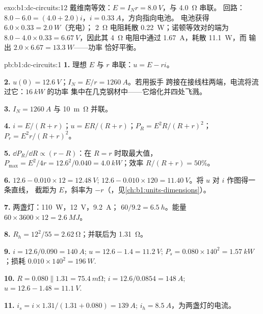 \begin{solution}{exo:b1:dc-circuits:12}
戴维南等效：$E = I_N r = \qty{8.0}{V}$，与 \qty{4.0}{\ohm} 串联。
回路：$8.0 - 6.0 = (4.0 + 2.0)i$，$i = \qty{0.33}{A}$，方向指向电池。
电池获得 $6.0 \times 0.33 = \qty{2.0}{W}$（充电）；
\qty{2}{\ohm} 电阻耗散 \qty{0.22}{W}；诺顿等效对的端为
$8.0 - 4.0 \times 0.33 = \qty{6.67}{V}$，因此其
\qty{4}{\ohm} 电阻中通过 \qty{1.67}{A}，耗散 \qty{11.1}{W}，而
输出 $2.0 \times 6.67 = \qty{13.3}{W}$——功率
恰好平衡。
\end{solution}

\begin{solution}{pb:b1:dc-circuits:1}
\textbf{1.} 理想 $E$ 与 $r$ 串联：$u = E - ri$。

\textbf{2.} $u(0) = \qty{12.6}{V}$；$I_N = E/r = \qty{1260}{A}$。若用扳手
跨接在接线柱两端，电流将流过它：$\qty{16}{kW}$ 的功率
集中在几克钢材中——它熔化并四处飞溅。

\textbf{3.}  $I_N = \qty{1260}{A}$ 与
\qty{10}{m\ohm} 并联。

\textbf{4.} $i = E/(R + r)$；$u = ER/(R + r)$；$P_R = E^2R/(R + r)^2$；
$P_r = E^2r/(R + r)^2$。

\textbf{5.} $\dd P_R/\dd R \propto (r - R)$：在 $R = r$ 时取最大值，
$P_{\max} = E^2/4r = 12.6^2/0.040 = \qty{4.0}{kW}$；效率
$R/(R + r) = 50\%$。

\textbf{6.} $12.6 - 0.010 \times 12 = \qty{12.48}{V}$; $12.6 - 0.010 \times
120 = \qty{11.40}{V}$。将 $u$ 对 $i$ 作图得一条直线，
截距为 $E$，斜率为 $-r$（，见\cref{ch:b1:units-dimensions}）。

\textbf{7.} 两盏灯：\qty{110}{W}，\qty{12}{V}，\qty{9.2}{A}；
$60/9.2 = \qty{6.5}{h}$。能量 $60 \times 3600 \times 12 = \qty{2.6}{MJ}$。

\textbf{8.} $R_h = 12^2/55 = \qty{2.62}{\ohm}$；并联后为 \qty{1.31}{\ohm}。

\textbf{9.} $i = 12.6/0.090 = \qty{140}{A}$; $u = 12.6 - 1.4 = \qty{11.2}{V}$;
$P_s = 0.080 \times 140^2 = \qty{1.57}{kW}$；损耗 $0.010 \times 140^2 =
\qty{196}{W}$.

\textbf{10.} $R = 0.080 \parallel 1.31 = \qty{75.4}{m\ohm}$; $i = 12.6/0.0854
= \qty{148}{A}$; $u = 12.6 - 1.48 = \qty{11.1}{V}$.

\textbf{11.} $i_s = i \times 1.31/(1.31 + 0.080) = \qty{139}{A}$; $i_h =
\qty{8.5}{A}$，为两盏灯的电流。


\end{solution}

